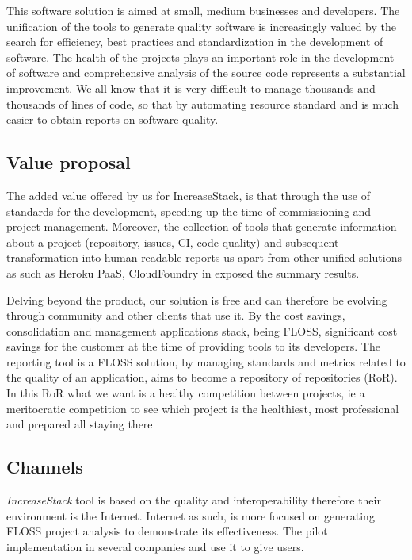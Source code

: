 \documentclass[11pt]{scrartcl}
\begin{document}
This software solution is aimed at small, medium businesses and developers. The unification of the tools to generate quality software is increasingly valued by the search for efficiency, best practices and standardization in the development of software. The health of the projects plays an important role in the development of software and comprehensive analysis of the source code represents a substantial improvement. We all know that it is very difficult to manage thousands and thousands of lines of code, so that by automating resource standard and is much easier to obtain reports on software quality.
    
\subsection{Value proposal}

\par The added value offered by us for IncreaseStack, is that through the use of standards for the development, speeding up the time of commissioning and project management. Moreover, the collection of tools that generate information about a project (repository, issues, CI, code quality) and subsequent transformation into human readable reports us apart from other unified solutions as such as Heroku PaaS, CloudFoundry in exposed the summary results.

\par Delving beyond the product, our solution is free and can therefore be evolving through community and other clients that use it. By the cost savings, consolidation and management applications stack, being FLOSS, significant cost savings for the customer at the time of providing tools to its developers. The reporting tool is a FLOSS solution, by managing standards and metrics related to the quality of an application, aims to become a repository of repositories (RoR). In this RoR what we want is a healthy competition between projects, ie a meritocratic competition to see which project is the healthiest, most professional and prepared all staying there

\subsection{Channels}

\par \emph{IncreaseStack} tool is based on the quality and interoperability therefore their environment is the Internet. Internet as such, is more focused on generating FLOSS project analysis to demonstrate its effectiveness. The pilot implementation in several companies and use it to give users.
\end{document}
